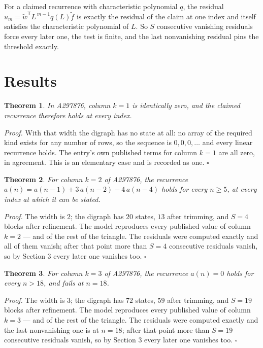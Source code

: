 \documentclass[11pt]{article}
\newtheorem{theorem}{Theorem}
\theoremstyle{definition}
\begin{document}
For a claimed recurrence with characteristic polynomial $q$, the residual $u_m = \tilde w^{\mathsf T}L^{\,m-1}q(L)\tilde f$ is exactly the residual of the claim at one index and itself satisfies the characteristic polynomial of $L$. So $S$ consecutive vanishing residuals force every later one, the test is finite, and the last nonvanishing residual pins the threshold exactly.

\section{Results}

\begin{theorem} In A297876, column $k = 1$ is identically zero, and the claimed recurrence therefore holds at every index.\end{theorem}

{\itshape Proof.} With that width the digraph has no state at all: no array of the required kind exists for any number of rows, so the sequence is $0,0,0,\dots$ and every linear recurrence holds. The entry's own published terms for column $k = 1$ are all zero, in agreement. This is an elementary case and is recorded as one. $\square$

\begin{theorem} For column $k = 2$ of A297876, the recurrence $a(n) = a(n-1) + 3\,a(n-2) - 4\,a(n-4)$ holds for every $n \ge 5$, at every index at which it can be stated.\end{theorem}

{\itshape Proof.} The width is $2$; the digraph has $20$ states, $13$ after trimming, and $S = 4$ blocks after refinement. The model reproduces every published value of column $k = 2$ --- and of the rest of the triangle. The residuals were computed exactly and all of them vanish; after that point more than $S = 4$ consecutive residuals vanish, so by Section 3 every later one vanishes too. $\square$

\begin{theorem} For column $k = 3$ of A297876, the recurrence $a(n) = 0$ holds for every $n > 18$, and fails at $n = 18$.\end{theorem}

{\itshape Proof.} The width is $3$; the digraph has $72$ states, $59$ after trimming, and $S = 19$ blocks after refinement. The model reproduces every published value of column $k = 3$ --- and of the rest of the triangle. The residuals were computed exactly and the last nonvanishing one is at $n = 18$; after that point more than $S = 19$ consecutive residuals vanish, so by Section 3 every later one vanishes too. $\square$
\end{document}
